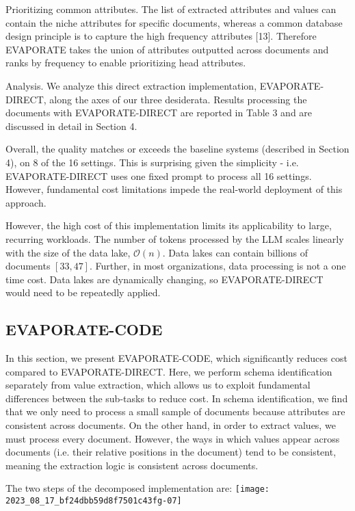 \documentclass[10pt]{article}
\begin{document}
Prioritizing common attributes. The list of extracted attributes and values can contain the niche attributes for specific documents, whereas a common database design principle is to capture the high frequency attributes [13]. Therefore EVAPORATE takes the union of attributes outputted across documents and ranks by frequency to enable prioritizing head attributes.

Analysis. We analyze this direct extraction implementation, EVAPORATE-DIRECT, along the axes of our three desiderata. Results processing the documents with EVAPORATE-DIRECT are reported in Table 3 and are discussed in detail in Section 4.

Overall, the quality matches or exceeds the baseline systems (described in Section 4), on 8 of the 16 settings. This is surprising given the simplicity - i.e. EVAPORATE-DIRECT uses one fixed prompt to process all 16 settings. However, fundamental cost limitations impede the real-world deployment of this approach.

However, the high cost of this implementation limits its applicability to large, recurring workloads. The number of tokens processed by the LLM scales linearly with the size of the data lake, $\mathcal{O}(n)$. Data lakes can contain billions of documents $[33,47]$. Further, in most organizations, data processing is not a one time cost. Data lakes are dynamically changing, so EVAPORATE-DIRECT would need to be repeatedly applied.

\subsection{EVAPORATE-CODE}
In this section, we present EVAPORATE-CODE, which significantly reduces cost compared to EVAPORATE-DIRECT. Here, we perform schema identification separately from value extraction, which allows us to exploit fundamental differences between the sub-tasks to reduce cost. In schema identification, we find that we only need to process a small sample of documents because attributes are consistent across documents. On the other hand, in order to extract values, we must process every document. However, the ways in which values appear across documents (i.e. their relative positions in the document) tend to be consistent, meaning the extraction logic is consistent across documents.

The two steps of the decomposed implementation are:
\texttt{[image: 2023\_08\_17\_bf24dbb59d8f7501c43fg-07]}
\end{document}
